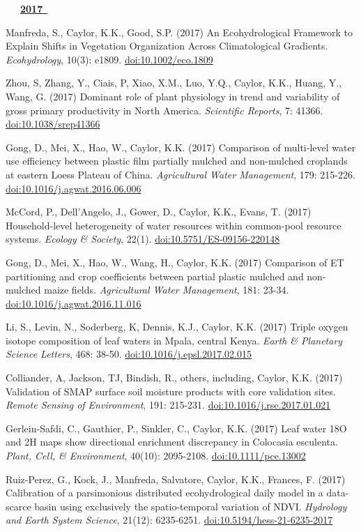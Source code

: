 \begin{etaremune}
\mbox{\ \ \ \underline{\textbf{2017 }}}

\item Manfreda, S., Caylor, K.K., Good, S.P. (2017) An Ecohydrological Framework to Explain Shifts in Vegetation Organization Across Climatological Gradients. \emph{Ecohydrology}, 10(3): e1809. \href{https://doi.org/10.1002/eco.1809 }{doi:10.1002/eco.1809}
\item Zhou, S, Zhang, Y., Ciais, P, Xiao, X.M., Luo, Y.Q., Caylor, K.K., Huang, Y., Wang, G. (2017) Dominant role of plant physiology in trend and variability of gross primary productivity in North America. \emph{Scientific Reports}, 7: 41366. \href{https://doi.org/10.1038/srep41366}{doi:10.1038/srep41366}
\item Gong, D., Mei, X., Hao, W., Caylor, K.K. (2017) Comparison of multi-level water use efficiency between plastic film partially mulched and non-mulched croplands at eastern Loess Plateau of China. \emph{Agricultural Water Management}, 179: 215-226. \href{https://doi.org/10.1016/j.agwat.2016.06.006}{doi:10.1016/j.agwat.2016.06.006}
\item McCord, P., Dell'Angelo, J., Gower, D., Caylor, K.K., Evans, T. (2017) Household-level heterogeneity of water resources within common-pool resource systems. \emph{Ecology \& Society}, 22(1). \href{https://doi.org/10.5751/ES-09156-220148}{doi:10.5751/ES-09156-220148}
\item Gong, D., Mei, X., Hao, W., Wang, H., Caylor, K.K. (2017) Comparison of ET partitioning and crop coefficients between partial plastic mulched and non-mulched maize fields. \emph{Agricultural Water Management}, 181: 23-34. \href{https://doi.org/10.1016/j.agwat.2016.11.016}{doi:10.1016/j.agwat.2016.11.016}
\item Li, S., Levin, N., Soderberg, K, Dennis, K.J., Caylor, K.K. (2017) Triple oxygen isotope composition of leaf waters in Mpala, central Kenya. \emph{Earth \& Planetary Science Letters}, 468: 38-50. \href{https://doi.org/10.1016/j.epsl.2017.02.015}{doi:10.1016/j.epsl.2017.02.015}
\item Colliander, A, Jackson, TJ, Bindish, R., others, including, Caylor, K.K. (2017) Validation of SMAP surface soil moisture products with core validation sites. \emph{Remote Sensing of Environment}, 191: 215-231. \href{https://doi.org/10.1016/j.rse.2017.01.021}{doi:10.1016/j.rse.2017.01.021}
\item Gerlein-Safdi, C., Gauthier, P., Sinkler, C., Caylor, K.K. (2017) Leaf water 18O and 2H maps show directional enrichment discrepancy in Colocasia esculenta. \emph{Plant, Cell, \& Environment}, 40(10): 2095-2108. \href{https://doi.org/10.1111/pce.13002}{doi:10.1111/pce.13002}
\item Ruiz-Perez, G., Kock, J., Manfreda, Salvatore, Caylor, K.K., Frances, F. (2017) Calibration of a parsimonious distributed ecohydrological daily model in a data-scarce basin using exclusively the spatio-temporal variation of NDVI. \emph{Hydrology and Earth System Science}, 21(12): 6235-6251. \href{https://doi.org/10.5194/hess-21-6235-2017}{doi:10.5194/hess-21-6235-2017}


\end{etaremune}
